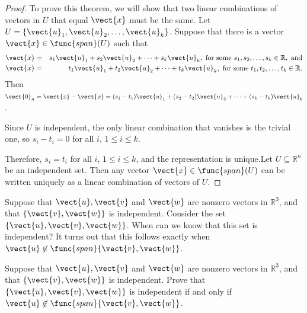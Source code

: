 \begin{proof}
To prove this theorem, we will show that two linear combinations of vectors in $U$ that equal $\vect{x}$ must be the same. Let $U =\{ \vect{u}_1, \vect{u}_2, \ldots, \vect{u}_k\}$.
Suppose that there is a vector $\vect{x}\in \func{span}(U)$ such that
\begin{eqnarray*}
\vect{x} & = & s_1\vect{u}_1 + s_2\vect{u}_2 + \cdots + s_k\vect{u}_k,
\mbox{ for some } s_1, s_2, \ldots, s_k\in\mathbb{R}, \mbox{ and} \\
\vect{x} & = & t_1\vect{u}_1 + t_2\vect{u}_2 + \cdots + t_k\vect{u}_k,
\mbox{ for some } t_1, t_2, \ldots, t_k\in\mathbb{R}.
\end{eqnarray*}
Then 
$\vect{0}_n=\vect{x}-\vect{x} = (s_1-t_1)\vect{u}_1 + (s_2-t_2)\vect{u}_2 + \cdots +
(s_k-t_k)\vect{u}_k$.

Since $U$ is independent, the only linear combination that vanishes
is the trivial one, so $s_i-t_i=0$ for all $i$, $1\leq i\leq k$.

Therefore, $s_i=t_i$ for all $i$, $1\leq i\leq k$, and the
representation is unique.Let $U \subseteq\mathbb{R}^n$ be an independent set.
Then any vector $\vect{x}\in\func{span}(U)$ can be written uniquely as a linear combination of vectors of $U$.
\end{proof}

Suppose that $\vect{u},\vect{v}$ and $\vect{w}$ are nonzero vectors in $\mathbb{R}^3$,
and that $\{ \vect{v},\vect{w}\}$ is independent. Consider the set $\{ \vect{u},\vect{v},\vect{w}\}$. When can we know that this set is independent? It turns out that this follows exactly when $\vect{u}\not\in\func{span}\{\vect{v},\vect{w}\}$.

\begin{example}{}
Suppose that $\vect{u},\vect{v}$ and $\vect{w}$ are nonzero vectors in $\mathbb{R}^3$,
and that $\{ \vect{v},\vect{w}\}$ is independent.
Prove that $\{ \vect{u},\vect{v},\vect{w}\}$ is independent if and only if 
$\vect{u}\not\in\func{span}\{\vect{v},\vect{w}\}$.
\end{example}

